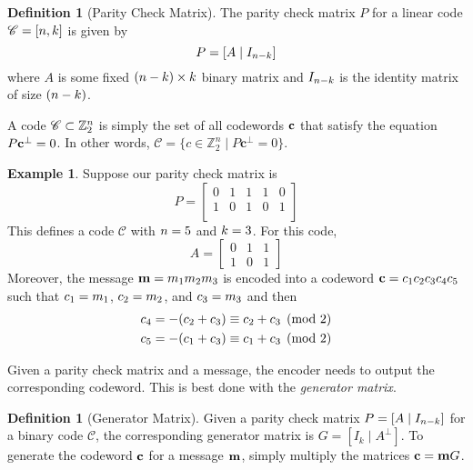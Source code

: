 \documentclass[12pt,twoside]{reedthesis}
\theoremstyle{definition}
\newtheorem{definition}[theorem]{Definition}
\newtheorem{example}[theorem]{Example}
\newcommand{\Z}{\mathbb{Z}}
\begin{document}
\begin{definition}[Parity Check Matrix] The parity check matrix $P$ for a linear code $\mathscr{C} = [n, k]$ is given by 
\begin{equation*}
P = [A \mid I_{n-k}]
\end{equation*}
where $A$ is some fixed $(n-k) \times k$ binary matrix and $I_{n-k}$ is the identity matrix of size $(n-k)$.
\end{definition}
A code $\mathscr{C}\subset \Z_2^\clen$ is simply the set of all codewords $\mathbf{c}$ that satisfy the equation $P\mathbf{c}^{\bot} = 0$. In other words, $\mathscr{C} = \{c\in \Z_2^n \mid P\mathbf{c}^{\bot} = 0\}$.
\begin{example} \label{P_ex} Suppose our parity check matrix is
\begin{equation*}
P = 
\left[
\begin{array}{ccc|cc}
0 & 1 & 1 & 1 & 0 \\
1 & 0 & 1 & 0 & 1\\
\end{array}
\right]
\end{equation*}
This defines a code $\mathscr{C}$ with $n = 5$ and $k = 3$. For this code,
\begin{equation*}
A = 
\begin{bmatrix}
0 & 1 & 1\\
1 & 0 & 1
\end{bmatrix}
\end{equation*}
Moreover, the message $\mathbf{m} = m_{1}m_{2}m_{3}$ is encoded into a codeword $\mathbf{c} = c_{1}c_{2}c_{3}c_{4}c_{5}$ such that $c_{1} = m_{1}$, $c_{2} = m_{2}$, and $c_{3} = m_{3}$ and then
\begin{align*}
& c_{4} = -(c_{2} + c_{3}) \equiv c_{2} + c_{3} \pmod 2\\
& c_{5} =  -(c_{1} + c_{3}) \equiv c_{1} + c_{3} \pmod 2
\end{align*}
\end{example}

Given a parity check matrix and a message, the encoder needs to output the corresponding codeword. This is best done with the \textit{generator matrix}.

\begin{definition}[Generator Matrix] Given a parity check matrix $P = [A\mid I_{n-k}]$ for a binary code $\mathscr{C}$, the corresponding generator matrix is $G = [I_k \mid A^{\bot}]$.
To generate the codeword $\mathbf{c}$ for a message $\mathbf{m}$, simply multiply the matrices $\mathbf{c} = \mathbf{m} G$.
\end{definition}
\end{document}
